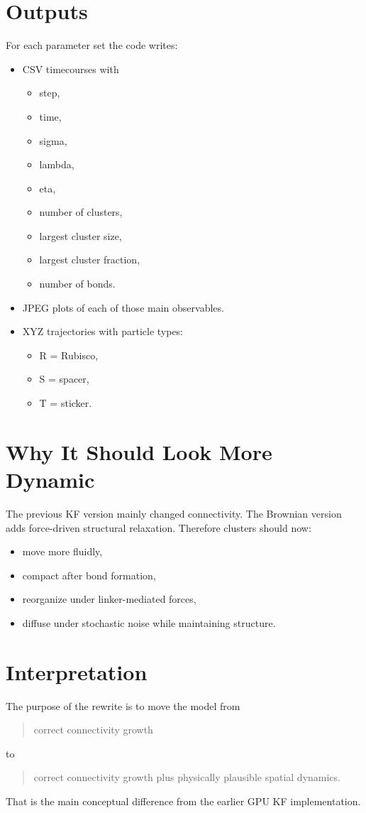 \documentclass[11pt]{article}
\begin{document}
\section{Outputs}
For each parameter set the code writes:
\begin{itemize}
    \item CSV timecourses with
    \begin{itemize}
        \item step,
        \item time,
        \item sigma,
        \item lambda,
        \item eta,
        \item number of clusters,
        \item largest cluster size,
        \item largest cluster fraction,
        \item number of bonds.
    \end{itemize}
    \item JPEG plots of each of those main observables.
    \item XYZ trajectories with particle types:
    \begin{itemize}
        \item R = Rubisco,
        \item S = spacer,
        \item T = sticker.
    \end{itemize}
\end{itemize}

\section{Why It Should Look More Dynamic}
The previous KF version mainly changed connectivity. The Brownian version adds force-driven structural relaxation. Therefore clusters should now:
\begin{itemize}
    \item move more fluidly,
    \item compact after bond formation,
    \item reorganize under linker-mediated forces,
    \item diffuse under stochastic noise while maintaining structure.
\end{itemize}

\section{Interpretation}
The purpose of the rewrite is to move the model from
\begin{quote}
correct connectivity growth
\end{quote}
to
\begin{quote}
correct connectivity growth plus physically plausible spatial dynamics.
\end{quote}

That is the main conceptual difference from the earlier GPU KF implementation.
\end{document}

